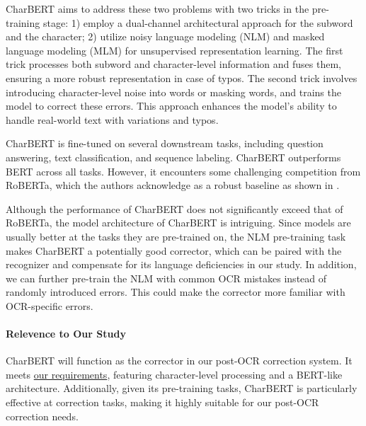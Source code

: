 CharBERT aims to address these two problems with two tricks in the pre-training stage: 1) employ a dual-channel architectural approach for the subword and the character; 2) utilize noisy language modeling (NLM) and masked language modeling (MLM) for unsupervised representation learning. The first trick processes both subword and character-level information and fuses them, ensuring a more robust representation in case of typos. The second trick involves introducing character-level noise into words or masking words, and trains the model to correct these errors. This approach enhances the model's ability to handle real-world text with variations and typos. 

CharBERT is fine-tuned on several downstream tasks, including question answering, text classification, and sequence labeling. CharBERT outperforms BERT across all tasks. However, it encounters some challenging competition from RoBERTa, which the authors acknowledge as a robust baseline as shown in .


Although the performance of CharBERT does not significantly exceed that of RoBERTa, the model architecture of CharBERT is intriguing. Since models are usually better at the tasks they are pre-trained on, the NLM pre-training task makes CharBERT a potentially good corrector, which can be paired with the recognizer and compensate for its language deficiencies in our study. In addition, we can further pre-train the NLM with common OCR mistakes instead of randomly introduced errors. This could make the corrector more familiar with OCR-specific errors.

\paragraph*{Relevence to Our Study}
CharBERT will function as the corrector in our post-OCR correction system. It meets \hyperlink{model_needs}{our requirements}, featuring character-level processing and a BERT-like architecture. Additionally, given its pre-training tasks, CharBERT is particularly effective at correction tasks, making it highly suitable for our post-OCR correction needs. 

